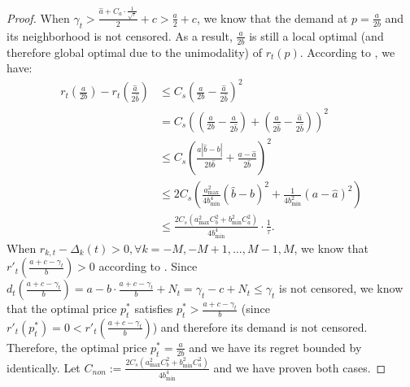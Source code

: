 \begin{proof}
    When $\gamma_t>\frac{\hat a + C_a\cdot\frac1{\sqrt{\tau}}}2+c>\frac{a}2+c$, we know that the demand at $p=\frac{a}{2b}$ and its neighborhood is not censored. As a result, $\frac{a}{2b}$ is still a local optimal (and therefore global optimal due to the unimodality) of $r_t(p)$. According to , we have:
    \begin{equation}
        \label{eq:regret_corner_case_1}
        \begin{aligned}
            r_t(\frac{a}{2b})-r_t(\frac{\hat a}{2\hat b})&\leq C_s(\frac{a}{2b}-\frac{\hat a}{2\hat b})^2\\
            &= C_s((\frac{a}{2b}-\frac{a}{2\hat b}) + (\frac{a}{2\hat b}-\frac{\hat a}{2\hat b}))^2\\
            &\leq C_s(\frac{a|\hat b - b|}{2b\hat b} + \frac{a-\hat a}{2\hat b})^2\\
            &\leq 2C_s(\frac{a_{\max}^2}{4b_{\min}^4} (\hat b - b)^2 + \frac1{4b_{\min}^2}(a-\hat a)^2)\\
            &\leq \frac{2C_s(a_{\max}^2 C_b^2 + b_{\min}^2C_a^2)}{4b_{\min}^4}\cdot\frac1{\tau}.
        \end{aligned}
    \end{equation}
    When $\hat r_{k,t}-\Delta_k(t)>0, \forall k=-M, -M+1,\ldots, M-1, M$, we know that $r'_t(\frac{a+c-\gamma_t}b)>0$ according to . Since $d_t(\frac{a+c-\gamma_t}b)=a-b\cdot\frac{a+c-\gamma_t}b+N_t = \gamma_t-c+N_t\leq\gamma_t$ is not censored, we know that the optimal price $p_t^*$ satisfies $p_t^*>\frac{a+c-\gamma_t}b$ (since $r'_t(p_t^*)=0<r'_t(\frac{a+c-\gamma_t}b)$) and therefore its demand is not censored. Therefore, the optimal price $p_t^*=\frac{a}{2b}$ and we have its regret bounded by  identically. Let $C_{non}:=\frac{2C_s(a_{\max}^2 C_b^2 + b_{\min}^2C_a^2)}{4b_{\min}^4}$ and we have proven both cases.
\end{proof}